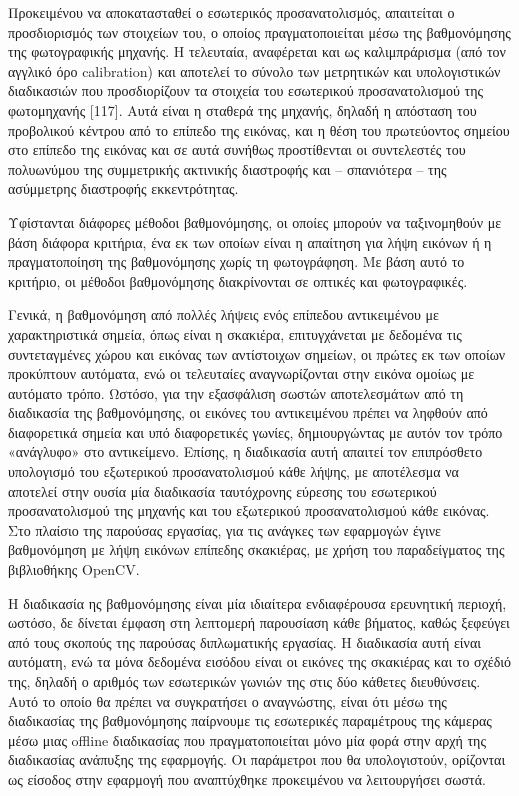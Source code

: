 

Προκειμένου να αποκατασταθεί ο εσωτερικός προσανατολισμός, απαιτείται ο προσδιορισμός των στοιχείων του, ο οποίος πραγματοποιείται μέσω της βαθμονόμησης της φωτογραφικής μηχανής. Η τελευταία, αναφέρεται και ως καλιμπράρισμα (από τον αγγλικό όρο calibration) και αποτελεί το σύνολο των μετρητικών και υπολογιστικών διαδικασιών που προσδιορίζουν τα στοιχεία του εσωτερικού προσανατολισμού της φωτομηχανής [117]. Αυτά είναι η σταθερά της μηχανής, δηλαδή η απόσταση του προβολικού κέντρου από το επίπεδο της εικόνας, και η θέση του πρωτεύοντος σημείου στο επίπεδο της εικόνας και σε αυτά συνήθως προστίθενται οι συντελεστές του πολυωνύμου της συμμετρικής ακτινικής διαστροφής και – σπανιότερα – της ασύμμετρης διαστροφής εκκεντρότητας.


Υφίστανται διάφορες μέθοδοι βαθμονόμησης, οι οποίες μπορούν να ταξινομηθούν με βάση διάφορα κριτήρια, ένα εκ των οποίων είναι η απαίτηση για λήψη εικόνων ή η πραγματοποίηση της βαθμονόμησης χωρίς τη φωτογράφηση. Με βάση αυτό το κριτήριο, οι μέθοδοι βαθμονόμησης διακρίνονται σε οπτικές και φωτογραφικές.


Γενικά, η βαθμονόμηση από πολλές λήψεις ενός επίπεδου αντικειμένου με χαρακτηριστικά σημεία, όπως είναι η σκακιέρα, επιτυγχάνεται με δεδομένα τις συντεταγμένες χώρου και εικόνας των αντίστοιχων σημείων, οι πρώτες εκ των οποίων προκύπτουν αυτόματα, ενώ οι τελευταίες αναγνωρίζονται στην εικόνα ομοίως με αυτόματο τρόπο. Ωστόσο, για την εξασφάλιση σωστών αποτελεσμάτων από τη διαδικασία της βαθμονόμησης, οι εικόνες του αντικειμένου πρέπει να ληφθούν από διαφορετικά σημεία και υπό διαφορετικές γωνίες, δημιουργώντας με αυτόν τον τρόπο «ανάγλυφο» στο αντικείμενο. Επίσης, η διαδικασία αυτή απαιτεί τον επιπρόσθετο υπολογισμό του εξωτερικού προσανατολισμού κάθε λήψης, με αποτέλεσμα να αποτελεί στην ουσία μία διαδικασία ταυτόχρονης εύρεσης του εσωτερικού προσανατολισμού της μηχανής και του εξωτερικού προσανατολισμού κάθε εικόνας. Στο πλαίσιο της παρούσας εργασίας, για τις ανάγκες των εφαρμογών έγινε βαθμονόμηση με λήψη εικόνων επίπεδης σκακιέρας, με χρήση του παραδείγματος της βιβλιοθήκης OpenCV. 

Η διαδικασία ης βαθμονόμησης είναι μία ιδιαίτερα ενδιαφέρουσα ερευνητική περιοχή, ωστόσο, δε δίνεται έμφαση στη λεπτομερή παρουσίαση κάθε βήματος, καθώς ξεφεύγει από τους σκοπούς της παρούσας διπλωματικής εργασίας.  Η διαδικασία αυτή είναι αυτόματη, ενώ τα μόνα δεδομένα εισόδου είναι οι εικόνες της σκακιέρας και το σχέδιό της, δηλαδή ο αριθμός των εσωτερικών γωνιών της στις δύο κάθετες διευθύνσεις. Αυτό το οποίο θα πρέπει να συγκρατήσει ο αναγνώστης, είναι ότι μέσω της διαδικασίας της βαθμονόμησης παίρνουμε τις εσωτερικές παραμέτρους της κάμερας μέσω μιας offline διαδικασίας που πραγματοποιείται μόνο μία φορά στην αρχή της διαδικασίας ανάπυξης της εφαρμογής. Οι παράμετροι που θα υπολογιστούν, ορίζονται ως είσοδος στην εφαρμογή που αναπτύχθηκε προκειμένου να λειτουργήσει σωστά.


